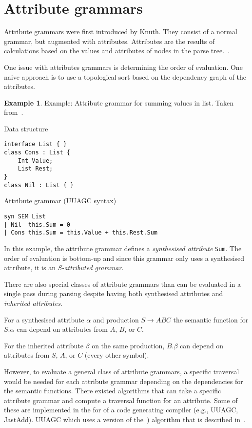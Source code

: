 \documentclass{article}
\theoremstyle{definition}
\newtheorem{example}{Example}[section]
\begin{document}
\section{Attribute grammars}

Attribute grammars were first introduced by Knuth. They consist of
a normal grammar, but augmented with attributes. Attributes are
the results of calculations based on the values and attributes of
nodes in the parse tree.~\cite{knuth1968semantics}.

One issue with attributes grammars is determining the order of
evaluation. One naive approach is to use a topological sort based
on the dependency graph of the attributes.

\begin{example}
Example: Attribute grammar for summing values in list. Taken
from~\cite{steinlechner2019attrgrammars}.

Data structure
\begin{lstlisting}
interface List { }
class Cons : List {
	Int Value;
	List Rest;
}
class Nil : List { }
\end{lstlisting}

Attribute grammar (UUAGC syntax)
\begin{lstlisting}
syn SEM List
| Nil  this.Sum = 0
| Cons this.Sum = this.Value + this.Rest.Sum
\end{lstlisting}
\end{example}

In this example, the attribute grammar defines a \emph{synthesised
attribute} \texttt{Sum}. The order of evaluation is bottom-up and
since this grammar only uses a synthesised attribute, it is an
\emph{S-attributed grammar}.

There are also special classes of attribute grammars than can be
evaluated in a single pass during parsing despite having both
synthesised attributes and \emph{inherited attributes}.

For a synthesised attribute \(\alpha\) and production \( S \to ABC
\) the semantic function for \(S.\alpha\) can depend on attributes
from \(A\), \(B\), or \(C\).

For the inherited attribute \(\beta\) on the same production,
\(B.\beta\) can depend on attributes from \(S\), \(A\), or \(C\)
(every other symbol).

However, to evaluate a general class of attribute grammars, a
specific traversal would be needed for each attribute grammar
depending on the dependencies for the semantic functions. There
existed algorithms that can take a specific attribute grammar and
compute a traversal function for an attribute. Some of these are
implemented in the for of a code generating compiler (e.g., UUAGC,
JastAdd). UUAGC which uses a version of
the~\cite{kennedy1976automatic}) algorithm that is described
in~\cite{bransen2012kennedy}.
\end{document}
